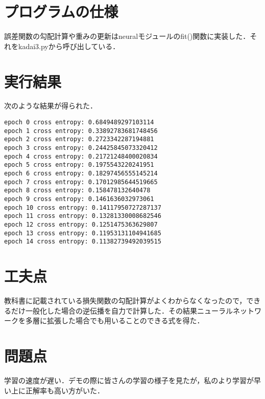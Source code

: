 \documentclass[uplatex]{jsarticle}
\begin{document}
    \section{プログラムの仕様}
    誤差関数の勾配計算や重みの更新はneuralモジュールのfit()関数に実装した．それをkadai3.pyから呼び出している．

    \section{実行結果}
    次のような結果が得られた．
    \begin{lstlisting}
epoch 0 cross entropy: 0.6849489297103114
epoch 1 cross entropy: 0.33892783681748456
epoch 2 cross entropy: 0.2723342287194881
epoch 3 cross entropy: 0.24425845073320412
epoch 4 cross entropy: 0.21721248400020834
epoch 5 cross entropy: 0.1975543220241951
epoch 6 cross entropy: 0.18297456555145214
epoch 7 cross entropy: 0.17012985644519665
epoch 8 cross entropy: 0.158478132640478
epoch 9 cross entropy: 0.1461636032973061
epoch 10 cross entropy: 0.14117950727287137
epoch 11 cross entropy: 0.13281330008682546
epoch 12 cross entropy: 0.1251475363629807
epoch 13 cross entropy: 0.11953131104941685
epoch 14 cross entropy: 0.11382739492039515
    \end{lstlisting}

    \section{工夫点}
    教科書に記載されている損失関数の勾配計算がよくわからなくなったので，できるだけ一般化した場合の逆伝播を自力で計算した．その結果ニューラルネットワークを多層に拡張した場合でも用いることのできる式を得た．

    \section{問題点}
    学習の速度が遅い．デモの際に皆さんの学習の様子を見たが，私のより学習が早い上に正解率も高い方がいた．
\end{document}

